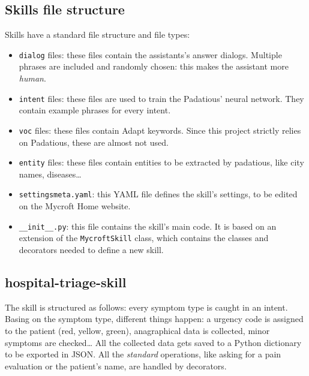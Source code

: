 \documentclass[conference]{IEEEtran}
\begin{document}
\subsection{Skills file structure}
Skills have a standard file structure and file types:
\begin{itemize}
    \item \texttt{dialog} files: these files contain the assistants's answer dialogs. Multiple phrases are included and randomly chosen: this makes the assistant more \textit{human}.
    \item \texttt{intent} files: these files are used to train the Padatious' neural network. They contain example phrases for every intent.
    \item \texttt{voc} files: these files contain Adapt keywords. Since this project strictly relies on Padatious, these are almost not used.
    \item \texttt{entity} files: these files contain entities to be extracted by padatious, like city names, diseases\dots
    \item \texttt{settingsmeta.yaml}: this YAML file defines the skill's settings, to be edited on the Mycroft Home website.
    \item \texttt{\_\_init\_\_.py}: this file contains the skill's main code. It is based on an extension of the \texttt{MycroftSkill} class, which contains the classes and decorators needed to define a new skill.
\end{itemize}
\subsection{hospital-triage-skill}
The skill is structured as follows: every symptom type is caught in an intent. Basing on the symptom type, different things happen: a urgency code is assigned to the patient (red, yellow, green), anagraphical data is collected, minor symptoms are checked\dots
All the collected data gets saved to a Python dictionary to be exported in JSON. All the \textit{standard} operations, like asking for a pain evaluation or the patient's name, are handled by decorators.
\end{document}
